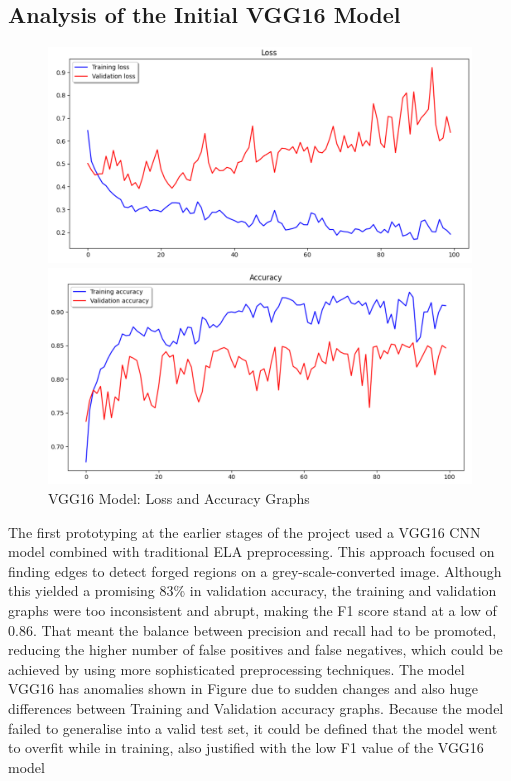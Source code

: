 \documentclass{ieeeaccess}
\begin{document}
  \subsection{Analysis of the Initial VGG16 Model}
    \begin{figure}[h!]
  	\centering
  	\begin{minipage}{0.45\textwidth}
  		\centering
  		\includegraphics[width=\linewidth]{LOSS_VGG16.png}
  	\end{minipage}
  	\hfill
  	\begin{minipage}{0.45\textwidth}
  		\centering
  		\includegraphics[width=\linewidth]{VGG16_ACC.png}
  	\end{minipage}
  	\caption{VGG16 Model: Loss and Accuracy Graphs}
  	\label{fig:vgg16-graphs}
  \end{figure}
  
  The first prototyping at the earlier stages of the project used a VGG16 CNN model combined with traditional ELA preprocessing. This approach focused on finding edges to detect forged regions on a grey-scale-converted image. Although this yielded a promising 83\% in validation accuracy, the training and validation graphs were too inconsistent and abrupt, making the F1 score stand at a low of 0.86. That meant the balance between precision and recall had to be promoted, reducing the higher number of false positives and false negatives, which could be achieved by using more sophisticated preprocessing techniques. The model VGG16 has anomalies shown in Figure  due to sudden changes and also huge differences between Training and Validation accuracy graphs. Because the model failed to generalise into a valid test set, it could be defined that the model went to overfit while in training, also justified with the low F1 value of the VGG16 model
  
\end{document}
